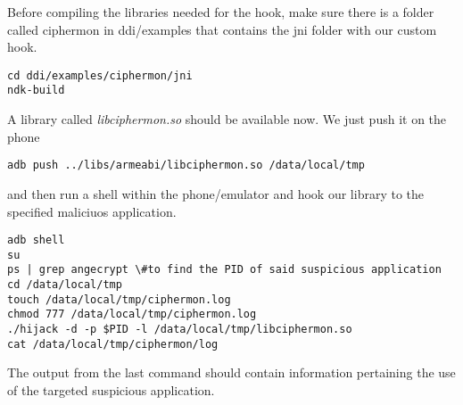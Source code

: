 Before compiling the libraries needed for the hook, make sure there is 
a folder called ciphermon in ddi/examples that contains the jni folder 
with our custom hook.

\begin{verbatim}
cd ddi/examples/ciphermon/jni
ndk-build
\end{verbatim}

A library called \emph{libciphermon.so} should be available now. We 
just push it on the phone
\begin{verbatim}
adb push ../libs/armeabi/libciphermon.so /data/local/tmp
\end{verbatim}
and then run a shell within the phone/emulator and hook our library 
to the specified maliciuos application.
\begin{verbatim}
adb shell
su
ps | grep angecrypt \#to find the PID of said suspicious application
cd /data/local/tmp
touch /data/local/tmp/ciphermon.log
chmod 777 /data/local/tmp/ciphermon.log
./hijack -d -p $PID -l /data/local/tmp/libciphermon.so
cat /data/local/tmp/ciphermon/log
\end{verbatim}

The output from the last command should contain information 
pertaining the use of the targeted suspicious application.



